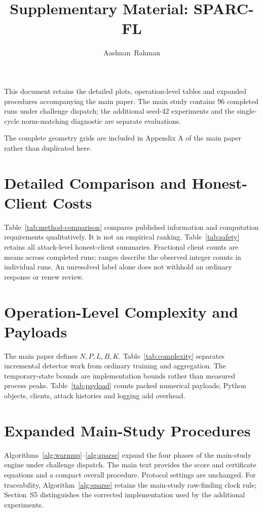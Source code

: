 \documentclass[journal]{IEEEtran}
\title{Supplementary Material: SPARC-FL}
\author{Aashnan~Rahman}
\begin{document}
\maketitle\raggedbottom
This document retains the detailed plots, operation-level tables and
expanded procedures accompanying the main paper. The main study
contains 96 completed runs under challenge dispatch; the additional
seed-42 experiments and the single-cycle norm-matching diagnostic are
separate evaluations.

The complete geometry grids are included in Appendix A of the main
paper rather than duplicated here.

\setcounter{section}{1}
\section{Detailed Comparison and Honest-Client Costs}
Table~\ref{tab:method-comparison} compares published information and
computation requirements qualitatively. It is not an empirical ranking.
Table~\ref{tab:safety} retains all attack-level honest-client summaries.
Fractional client counts are means across completed runs; ranges describe
the observed integer counts in individual runs. An unresolved label
alone does not withhold an ordinary response or renew review.


\FloatBarrier

\section{Operation-Level Complexity and Payloads}
The main paper defines $N,P,L,B,K$. Table~\ref{tab:complexity} separates
incremental detector work from ordinary training and aggregation.
The temporary-state bounds are implementation bounds rather than measured
process peaks. Table~\ref{tab:payload} counts packed numerical payloads;
Python objects, clients, attack histories and logging add overhead.


\FloatBarrier

\section{Expanded Main-Study Procedures}
Algorithms~\ref{alg:warmup}--\ref{alg:sparse} expand the four phases
of the main-study engine under challenge dispatch. The main text provides the score and
certificate equations and a compact overall procedure. Protocol settings
are unchanged. For traceability, Algorithm~\ref{alg:sparse} retains the
main-study raw-finding clock rule; Section~S5 distinguishes the corrected
implementation used by the additional experiments.

\FloatBarrier
\end{document}

